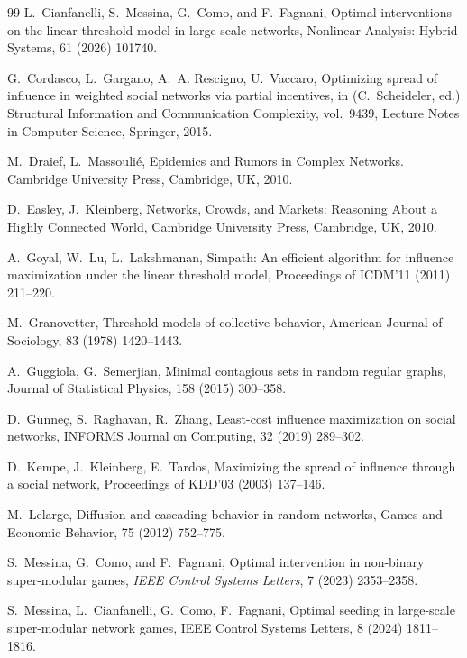 \documentclass[12pt,twoside,reqno]{amsart}
\theoremstyle{definition}
\numberwithin{equation}{section}
\newcommand{\0}{\mathbf{0}}
\newcommand{\1}{\mathbf{1}}
\begin{document}
\begin{thebibliography}{99}
 L.~Cianfanelli, S.~Messina, G.~Como, and F.~Fagnani, Optimal interventions on the linear threshold model in large-scale networks, Nonlinear Analysis: Hybrid Systems, 61 (2026) 101740. 

 G.~Cordasco, L.~Gargano, A.~A. Rescigno, U.~Vaccaro, Optimizing spread of influence in weighted social networks via partial incentives, in    (C.~Scheideler, ed.) Structural Information and Communication Complexity, vol.~9439, Lecture Notes in Computer Science, Springer, 2015.

 M.~Draief, L.~Massouli{\'e}, Epidemics and Rumors in Complex Networks. Cambridge University Press, Cambridge, UK, 2010.

 D.~Easley, J.~Kleinberg, Networks, Crowds, and Markets: Reasoning About a Highly Connected World, Cambridge University Press, Cambridge, UK, 2010.

A.~Goyal, W.~Lu, L.~Lakshmanan, Simpath: An efficient algorithm for influence maximization under the linear threshold model, Proceedings of ICDM'11 (2011) 211--220.

 M.~Granovetter, Threshold models of collective behavior, American Journal of Sociology, 83 (1978) 1420--1443.

A.~Guggiola, G.~Semerjian, Minimal contagious sets in random regular graphs, Journal of Statistical Physics, 158 (2015) 300--358.

 D.~G{\"u}nne{\c c}, S.~Raghavan, R.~Zhang, Least-cost influence maximization on social networks, INFORMS Journal on Computing, 32 (2019) 289--302.

D.~Kempe, J.~Kleinberg, E.~Tardos, Maximizing the spread of influence through a social network, Proceedings of KDD'03 (2003) 137--146.

M.~Lelarge, Diffusion and cascading behavior in random networks, Games and Economic Behavior, 75 (2012) 752--775.

 S.~Messina, G.~Como, and F.~Fagnani, Optimal intervention in non-binary super-modular games, {\em IEEE Control Systems Letters}, 7 (2023) 2353--2358.

 S.~Messina, L.~Cianfanelli, G.~Como, F.~Fagnani, Optimal seeding in large-scale super-modular network games, IEEE Control Systems Letters, 8 (2024) 1811--1816.


\end{thebibliography}
\end{document}
